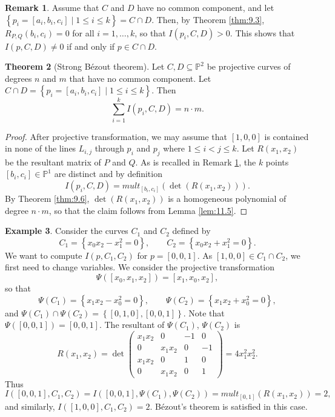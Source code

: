 \documentclass{article}
\renewcommand{\P}{\mathbb{P}}
\newcommand{\rb}[1]{\left( #1 \right)}
\renewcommand{\sb}[1]{\left[ #1 \right]}
\newcommand{\cb}[1]{\left\{ #1 \right\}}
\theoremstyle{definition}\newtheorem{definition}{Definition}[section]
\theoremstyle{definition}\newtheorem{notation}[definition]{Notation}
\theoremstyle{definition}\newtheorem{remark}[definition]{Remark}
\theoremstyle{definition}\newtheorem{example}[definition]{Example}
\theoremstyle{definition}\newtheorem{fact}{Fact}
\theoremstyle{definition}\newtheorem{exercise}{Exercise}
\newtheorem{theorem}[definition]{Theorem}
\begin{document}
\begin{remark}
\label{rem:11.10}
Assume that $ C $ and $ D $ have no common component, and let $ \cb{p_i = \sb{a_i, b_i, c_i} \mid 1 \le i \le k} = C \cap D $. Then, by Theorem \ref{thm:9.3}, $ R_{P, Q}\rb{b_i, c_i} = 0 $ for all $ i = 1, \dots, k $, so that $ I\rb{p_i, C, D} > 0 $. This shows that $ I\rb{p, C, D} \ne 0 $ if and only if $ p \in C \cap D $.
\end{remark}

\begin{theorem}[Strong Bézout theorem]
\label{thm:11.11}
Let $ C, D \subseteq \P^2 $ be projective curves of degrees $ n $ and $ m $ that have no common component. Let $ C \cap D = \cb{p_i = \sb{a_i, b_i, c_i} \mid 1 \le i \le k} $. Then
$$ \sum_{i = 1}^k I\rb{p_i, C, D} = n \cdot m. $$
\end{theorem}

\begin{proof}
After projective transformation, we may assume that $ \sb{1, 0, 0} $ is contained in none of the lines $ L_{i, j} $ through $ p_i $ and $ p_j $ where $ 1 \le i < j \le k $. Let $ R\rb{x_1, x_2} $ be the resultant matrix of $ P $ and $ Q $. As is recalled in Remark \ref{rem:11.10}, the $ k $ points $ \sb{b_i, c_i} \in \P^1 $ are distinct and by definition
$$ I\rb{p_i, C, D} = mult_{\sb{b_i, c_i}}\rb{\det\rb{R\rb{x_1, x_2}}}. $$
By Theorem \ref{thm:9.6}, $ \det\rb{R\rb{x_1, x_2}} $ is a homogeneous polynomial of degree $ n \cdot m $, so that the claim follows from Lemma \ref{lem:11.5}.
\end{proof}


\begin{example}
Consider the curves $ C_1 $ and $ C_2 $ defined by
$$ C_1 = \cb{x_0x_2 - x_1^2 = 0}, \qquad C_2 = \cb{x_0x_2 + x_1^2 = 0}. $$
We want to compute $ I\rb{p, C_1, C_2} $ for $ p = \sb{0, 0, 1} $. As $ \sb{1, 0, 0} \in C_1 \cap C_2 $, we first need to change variables. We consider the projective transformation
$$ \Psi\rb{\sb{x_0, x_1, x_2}} = \sb{x_1, x_0, x_2}, $$
so that
$$ \Psi\rb{C_1} = \cb{x_1x_2 - x_0^2 = 0}, \qquad \Psi\rb{C_2} = \cb{x_1x_2 + x_0^2 = 0}, $$
and $ \Psi\rb{C_1} \cap \Psi\rb{C_2} = \cb{\sb{0, 1, 0}, \sb{0, 0, 1}} $. Note that $ \Psi\rb{\sb{0, 0, 1}} = \sb{0, 0, 1} $. The resultant of $ \Psi\rb{C_1} $, $ \Psi\rb{C_2} $ is
$$ R\rb{x_1, x_2} = \det\begin{pmatrix} x_1x_2 & 0 & -1 & 0 \\ 0 & x_1x_2 & 0 & -1 \\ x_1x_2 & 0 & 1 & 0 \\ 0 & x_1x_2 & 0 & 1 \end{pmatrix} = 4x_1^2x_2^2. $$
Thus
$$ I\rb{\sb{0, 0, 1}, C_1, C_2} = I\rb{\sb{0, 0, 1}, \Psi\rb{C_1}, \Psi\rb{C_2}} = mult_{\sb{0, 1}}\rb{R\rb{x_1, x_2}} = 2, $$
and similarly, $ I\rb{\sb{1, 0, 0}, C_1, C_2} = 2 $. Bézout's theorem is satisfied in this case.
\end{example}
\end{document}
